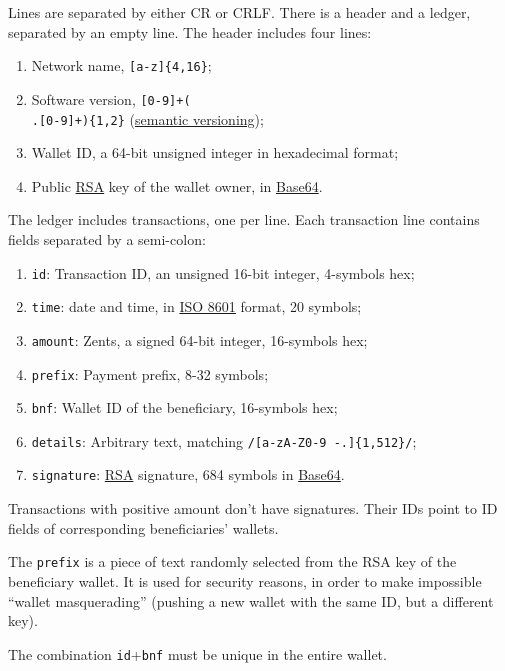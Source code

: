 \documentclass[11pt,oneside]{article}
\newcommand\dd[1]{\colorbox{gray!30}{\texttt{#1}}}
\begin{document}
Lines are separated by either CR or CRLF.
There is a header and a ledger, separated by an empty line.
The header includes four lines:

\begin{enumerate}
  \item Network name, \dd{[a-z]\{4,16\}};
  \item Software version, \dd{[0-9]+(\\.[0-9]+)\{1,2\}} (\href{https://semver.org/}{semantic versioning});
  \item Wallet ID, a 64-bit unsigned integer in hexadecimal format;
  \item Public \href{https://en.wikipedia.org/wiki/RSA_(cryptosystem)}{RSA}
    key of the wallet owner, in \href{https://en.wikipedia.org/wiki/Base64}{Base64}.
\end{enumerate}

The ledger includes transactions, one per line. Each transaction line
contains fields separated by a semi-colon:

\begin{enumerate}
  \item \dd{id}: Transaction ID, an unsigned 16-bit integer, 4-symbols hex;
  \item \dd{time}: date and time, in \href{https://en.wikipedia.org/wiki/ISO_8601}{ISO 8601} format, 20 symbols;
  \item \dd{amount}: Zents, a signed 64-bit integer, 16-symbols hex;
  \item \dd{prefix}: Payment prefix, 8-32 symbols;
  \item \dd{bnf}: Wallet ID of the beneficiary, 16-symbols hex;
  \item \dd{details}: Arbitrary text, matching \dd{/[a-zA-Z0-9 -.]\{1,512\}/};
  \item \dd{signature}: \href{https://en.wikipedia.org/wiki/RSA_(cryptosystem)}{RSA} signature,
    684 symbols in \href{https://en.wikipedia.org/wiki/Base64}{Base64}.
\end{enumerate}

Transactions with positive amount don't have signatures.
Their IDs point to ID fields of corresponding beneficiaries' wallets.

The \dd{prefix} is a piece of text randomly selected from the RSA key
of the beneficiary wallet. It is used for security reasons, in order
to make impossible ``wallet masquerading'' (pushing a new wallet with the
same ID, but a different key).

The combination \dd{id}+\dd{bnf} must be unique in the entire wallet.
\end{document}
